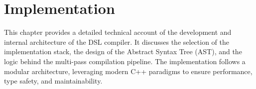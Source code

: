 \chapter{Implementation}\label{ch:implementation}

This chapter provides a detailed technical account of the development and internal architecture of the DSL compiler.
It discusses the selection of the implementation stack, the design of the Abstract Syntax Tree (AST), and the logic
behind the multi-pass compilation pipeline.
The implementation follows a modular architecture, leveraging modern C++ paradigms to ensure performance, type safety,
and maintainability.










